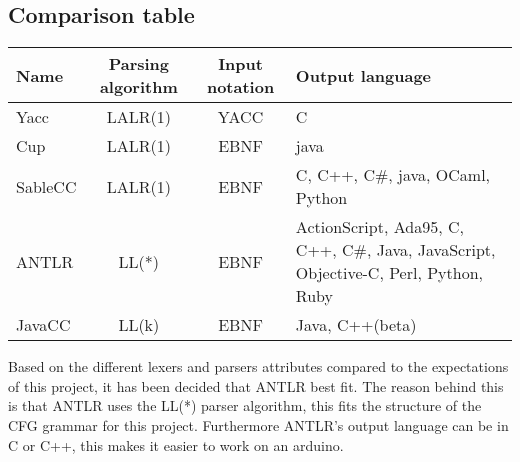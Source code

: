 \subsection{Comparison table}
\begin{tabular}{l|c|c|l|}
Name & Parsing algorithm & Input notation & Output language\\ \hline
Yacc & LALR(1) & YACC & C\\ \hline
Cup & LALR(1) & EBNF & java\\ \hline
SableCC & LALR(1) & EBNF & C, C++, C#, java, OCaml, Python\\ \hline
ANTLR & LL(*) & EBNF & ActionScript, Ada95, C, C++, C#, Java, JavaScript, Objective-C, Perl, Python, Ruby\\ \hline
JavaCC & LL(k) & EBNF & Java, C++(beta)\\ \hline
\end{tabular}

Based on the different lexers and parsers attributes compared to the expectations of this project, it has been decided that ANTLR best fit. The reason behind this is that ANTLR uses the LL(*) parser algorithm, this fits the structure of the CFG grammar for this project. Furthermore ANTLR's output language can be in C or C++, this makes it easier to work on an arduino.
